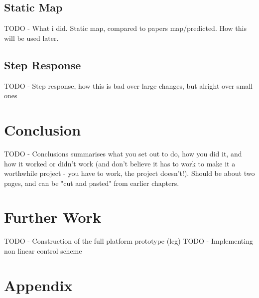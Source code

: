 \documentclass[11pt,a4paper]{article}
\begin{document}
\subsection{Static Map}
\label{sub:static_map}
TODO - What i did. Static map, compared to papers map/predicted. How this will be used later.
\subsection{Step Response}
\label{sub:step_response}
TODO - Step response, how this is bad over large changes, but alright over small ones

\newpage
\section{Conclusion}
\label{sec:conclusion}

\newline TODO - Conclusions summarises what you set out to do, how you did it, and how it worked or didn't work (and don't believe it has to work to make it a worthwhile project - you
have to work, the project doesn't!). Should be about two pages, and can be "cut and
pasted" from earlier chapters.


\newpage
\section{Further Work}
\label{sec:further}

\newline TODO - Construction of the full platform prototype (leg)
\newline TODO - Implementing non linear control scheme

\newpage

\section{Appendix}
\label{sec:appendix}
\end{document}
